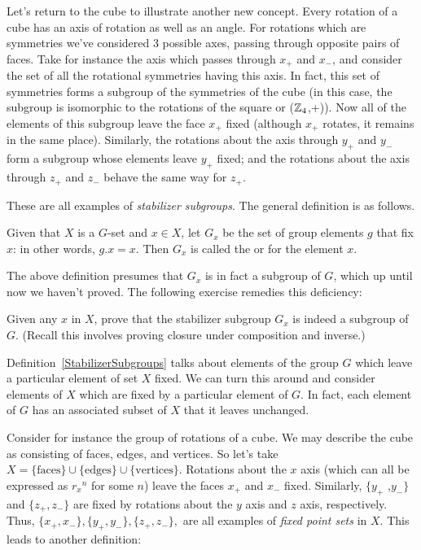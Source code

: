  Let's return to the cube to illustrate another new concept. Every rotation of a cube has an axis of rotation as well as an angle.   
 For rotations which are symmetries we've considered 3 possible axes, passing through opposite pairs of faces. 
Take for instance the axis which passes through $x_+$ and $x_-$, and consider the set of all the rotational symmetries having this axis.
In fact, this set of symmetries forms a subgroup  of the symmetries of the cube (in this case, the subgroup is isomorphic to the rotations of the square or ($\mathbb{Z}_4$,+)). Now all of the elements of this subgroup leave the face  $x_+$ fixed (although $x_+$ rotates, it remains in the same place).
Similarly, the rotations about the axis through $y_+$ and $y_-$ form a subgroup whose elements leave  $y_+$ fixed; and the rotations about the axis through $z_+$ and $z_-$ behave the same way for $z_+$.  

 These are all examples of \emph{stabilizer subgroups}. The general definition is as follows.

\begin{defn}\label{StabilizerSubgroups} 
Given that $X$ is a $G$-set and  $x \in X$, let $G_x$ be the set of  group elements $g$ that fix $x$:  in other words, $g.x=x$.  Then $G_x$ is called the  or  for the element $x$.
\end{defn}

The above definition presumes that $G_x$ is in fact a subgroup of $G$, which up until now we haven't proved. The following exercise remedies this deficiency:

\begin{exercise}\label{exercise:actions:Stabilizer1}
Given any $x$ in $X$, prove that the stabilizer subgroup $G_x$  is indeed a subgroup of $G$.  (Recall this involves proving closure under composition and inverse.)
\end{exercise}

Definition~\ref{StabilizerSubgroups} talks about elements of the group $G$ which leave a particular element of set $X$ fixed. We can turn this around and consider elements of $X$ which are fixed by a particular element of $G$. In fact, each element of $G$ has an associated subset of $X$ that it leaves unchanged. 

Consider for instance the group of rotations of a cube. We may describe the cube as consisting of faces, edges, and vertices. So let's take   $X=\{\text{faces}\}\cup\{\text{edges}\}\cup\{\text{vertices}\}$.  Rotations about the $x$ axis (which can all be expressed as ${r_x}^n$ for some $n$) leave the faces $x_+$ and $x_-$ fixed. Similarly, $\{y_+$ ,$y_-\}$ and $\{z_+,z_-\}$ are  fixed by rotations about the $y$ axis and $z$ axis, respectively.   Thus, $\{x_+,x_-\},\{y_+,y_-\},\{z_+,z_-\},$  are all examples of \emph{fixed point sets} in $X$.
This leads to another definition:

